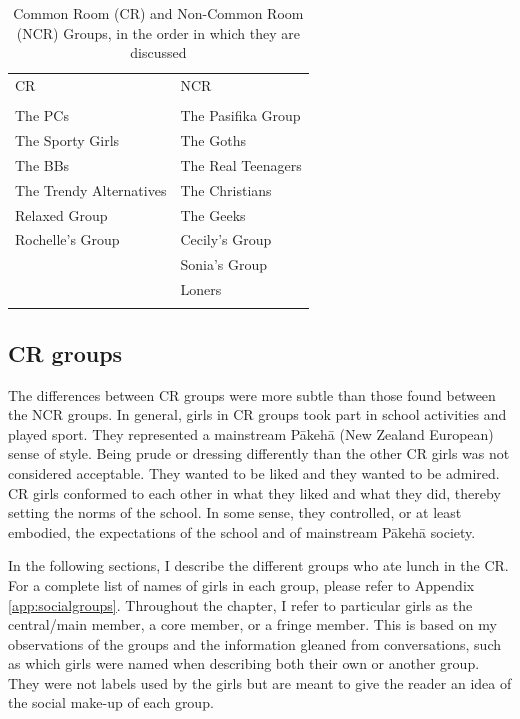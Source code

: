 \begin{table}[t]
\caption{Common Room (CR) and Non-Com\-mon Room (NCR) Groups, in the or\-der in which they are dis\-cussed}\label{CRNCR}
	 \begin{center}
		\begin{tabular}{ll}\lsptoprule
	
CR&NCR\\
	\\ \midrule
The PCs & The Pasifika Group\\
The Sporty Girls & The Goths\\
The BBs & The Real Teenagers \\
The Trendy Alternatives & The Christians\\
Relaxed Group & The Geeks \\
Rochelle's Group & Cecily's Group\\
 &  Sonia's Group\\
 & Loners \\

\lspbottomrule
		\end{tabular}
	
	\end{center}
\end{table} 

\subsection{CR groups}
\label{group:CR}

The differences between CR groups were more subtle than those found between the NCR groups. In general, girls in CR groups took part in school activities and played sport. They represented a mainstream P\=akeh\=a (New Zealand European) sense of style. Being prude or dressing differently than the other CR girls was not considered acceptable. They wanted to be liked and they wanted to be admired. CR girls conformed to each other in what they liked and what they did, thereby setting the norms of the school. In some sense, they controlled, or at least embodied, the expectations of the school and of mainstream P\=akeh\=a society.

In the following sections, I describe the different groups who ate lunch in the CR. For a complete list of names of girls in each group, please refer to Appendix \ref{app:socialgroups}. Throughout the chapter, I refer to particular girls as the central/main member, a core member, or a fringe member. This is based on my observations of the groups and the information gleaned from conversations, such as which girls were named when describing both their own or another group. They were not labels used by the girls but are meant to give the reader an idea of the social make-up of each group.

